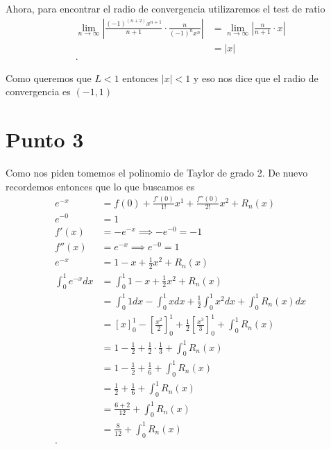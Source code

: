 \documentclass{report}
\begin{document}
Ahora, para encontrar el radio de convergencia utilizaremos el test de ratio
\begin{align*}
  \lim_{n \to \infty} \left| \frac{\left( -1 \right)^{(n + 2)}x^{n + 1}}{n + 1}\cdot \frac{n}{\left( -1 \right)^{n}x^{n}} \right| &= \lim_{n \to \infty} \left| \frac{n}{n + 1}\cdot x \right|  \\
  &= |x| \\
.\end{align*}

Como queremos que $L < 1$ entonces $\left| x \right| < 1$ y eso nos dice que el radio de convergencia es $\left( -1, 1 \right) $

\section{Punto 3}
Como nos piden tomemos el polinomio de Taylor de grado 2. De nuevo recordemos entonces que lo que buscamos es
\begin{align*}
  e^{-x} &= f\left( 0 \right) + \frac{f'\left( 0 \right) }{1!}x^{1} + \frac{f''\left( 0 \right) }{2!}x^{2} + R_n\left( x \right) \\
  e^{-0} &= 1 \\
  f'\left( x \right) &= -e^{-x} \implies -e^{-0} = -1 \\
  f''\left( x \right) &= e^{-x} \implies e^{-0} = 1 \\
  e^{-x} &= 1 - x + \frac{1}{2}x^2 + R_n\left( x \right) \\
  \int_{0}^{1} e^{-x} dx &= \int_{0}^{1} 1 - x + \frac{1}{2}x^2 + R_n\left( x \right)  \\
  &= \int_{0}^{1} 1 dx - \int_{0}^{1} x dx + \frac{1}{2}\int_{0}^{1} x^2 dx + \int_{0}^{1} R_n\left( x \right) dx\\
  &= \left[ x \right]_{0}^{1} - \left[ \frac{x^2}{2} \right]_{0}^{1} + \frac{1}{2}\left[ \frac{x^3}{3} \right]_{0}^{1} + \int_{0}^{1} R_n\left( x \right)  \\
  &= 1 - \frac{1}{2} + \frac{1}{2}\cdot \frac{1}{3} + \int_{0}^{1}R_n\left( x \right)  \\
  &= 1 - \frac{1}{2} + \frac{1}{6} + \int_{0}^{1} R_{n}\left( x \right)  \\
  &= \frac{1}{2} + \frac{1}{6} + \int_{0}^{1}R_n\left( x \right)  \\
  &= \frac{6 + 2}{12} + \int_{0}^{1}R_n\left( x \right)  \\
  &= \frac{8}{12} + \int_{0}^{1}R_n\left( x \right)  \\
.\end{align*}
\end{document}
